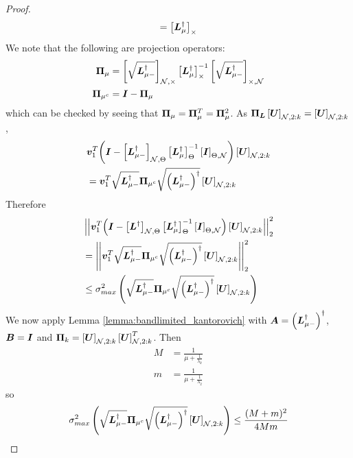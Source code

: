 \begin{proof}
\begin{equation}
     = \msub[\Theta]{\matr{L}^{\dagger}_{\mu}}
\end{equation}
    We note that the following are projection operators:
    \begin{align}
        \proj{\mu} &= \msub[N,\Theta]{\sqrt{\matr{L}_{\mu-}^{\dagger}}}\msub[\Theta]{\matr{L}^{\dagger}_{\mu}}^{-1} \msub[\Theta,N]{\sqrt{\matr{L}_{\mu-}^{\dagger}}} \\
        \projgen{\mu^{c}} &= \matr{I} - \proj{\mu}
    \end{align}
    which can be checked by seeing that $\proj{\mu} = \proj{\mu}^{T} = \proj{\mu}^{2}$.
As $\projgen{\matr{L}}\msubgen[\set{N},2:k]{\matr{U}} = \msubgen[\set{N},2:k]{\matr{U}}$,
\begin{align} 
    &{\vect{v}_{1}^{T}{\left( \matr{I} - \msubgen[\set{N},\Theta]{\matr{L}_{\mu -}^{\dagger}} \msubgen[\Theta]{ \matr{L}_{\mu}^{\dagger}}^{-1}\msubgen[\Theta,\set{N}]{\matr{I}}\right)\msubgen[\set{N},2:k]{\matr{U}}}} \\
    &=\vect{v}_{1}^{T}\sqrt{\matr{L}^{\dagger}_{\mu-}}\projgen{\mu^{c}}\sqrt{\left(\matr{L}^{\dagger}_{\mu-}\right)^{\dagger}} \msubgen[\set{N},2:k]{\matr{U}}
\end{align}
Therefore
\begin{align}
    &\sqnormvec{\vect{v}_{1}^{T}{\left( \matr{I} - \msubgen[\set{N},\Theta]{\matr{L}^{\dagger}} \msubgen[\Theta]{ \matr{L}_{\mu}^{\dagger}}^{-1}\msubgen[\Theta,\set{N}]{\matr{I}}\right)\msubgen[\set{N},2:k]{\matr{U}}}} \\
    &= \sqnormvec{ \vect{v}_{1}^{T}\sqrt{\matr{L}^{\dagger}_{\mu-}}\projgen{\mu^{c}}\sqrt{\left(\matr{L}^{\dagger}_{\mu-}\right)^{\dagger}} \msubgen[\set{N},2:k]{\matr{U}}} \\
    &\leq \sigma_{max}^{2}\left(\sqrt{\matr{L}^{\dagger}_{\mu-}}\projgen{\mu^{c}}\sqrt{\left(\matr{L}^{\dagger}_{\mu-}\right)^{\dagger}} \msubgen[\set{N},2:k]{\matr{U}} \right)
\end{align}
We now apply Lemma \ref{lemma:bandlimited_kantorovich} with $\bm{A} = {\left(\bm{L}^{\dagger}_{\mu-}\right)^{\dagger}}$, $\bm{B}=\bm{I}$ and $\projgen{k} = \msubgen[\set{N},2:k]{\matr{U}}\msubgen[\set{N},2:k]{\matr{U}}^{T}$. Then
\begin{align}
    M &= \frac{1}{\mu + \frac{1}{\lambda_{k}}} \\
    m &= \frac{1}{\mu + \frac{1}{\lambda_{2}}}
\end{align}
so
\begin{align}
\sigma_{max}^{2}\left(\sqrt{\matr{L}^{\dagger}_{\mu-}}\projgen{\mu^{c}}\sqrt{\left(\matr{L}^{\dagger}_{\mu-}\right)^{\dagger}} \msubgen[\set{N},2:k]{\matr{U}} \right) \leq \frac{(M+m)^{2}}{4Mm} 

\end{align}
\end{proof}
